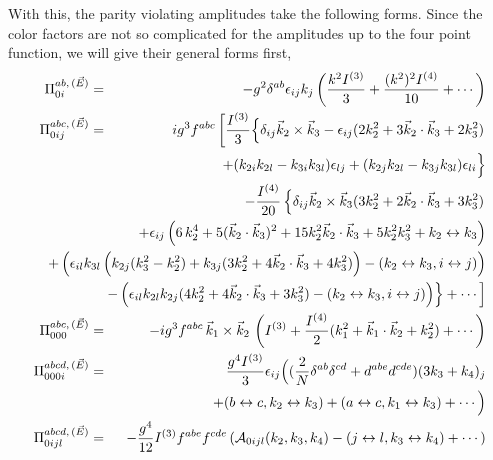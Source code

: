 \documentclass[a4paper,12pt]{article}
\begin{document}
With this, the parity violating amplitudes take the following
forms. Since the color factors are not so complicated for the
amplitudes up to the four point function, we will give their general
forms first,
\begin{eqnarray}
\Pi_{0i}^{ab,\,(\vec{E})} & = &  -
g^{2}\delta^{ab}\epsilon_{ij}k_{j}\left({k^{2}I^{(3)}\over 3} +
  {(k^{2})^{2}I^{(4)}\over 10} + \cdots \right)\nonumber\\
\Pi_{0ij}^{abc,\,(\vec{E})} & = & ig^{3}f^{abc}\left[{I^{(3)}\over
    3}\Big\{\delta_{ij}\vec{k}_{2}\times\vec{k}_{3} - \epsilon_{ij}(2
    k_{2}^{2}+3\vec{k}_{2}\cdot\vec{k}_{3} + 2
    k_{3}^{2})\right.\nonumber\\
 &  & \quad +  (k_{2i}k_{2l} - k_{3i}k_{3l}) \epsilon_{lj} +
   (k_{2j}k_{2l} - k_{3j}k_{3l}) \epsilon_{li}\Big\}\nonumber\\
 &  & \quad -{I^{(4)}\over 20}\left\{\delta_{ij}
   \vec{k}_{2}\times\vec{k}_{3} (3k_{2}^{2} + 2
   \vec{k}_{2}\cdot\vec{k}_{3} + 3 k_{3}^{2})\right.\nonumber\\
 & & \!\!\!\!\!\!\!\!\!\!\!\!\!\!\!\!\!\!\!\!\!\!\!\!\!\!\!\!\!\!  +
 \epsilon_{ij} \left(6\,k_{2}^{4} + 5
   (\vec{k}_{2}\cdot \vec{k}_{3})^{2} + 15 k_{2}^{2}
   \vec{k}_{2}\cdot\vec{k}_{3} + 5 k_{2}^{2}k_{3}^{2} +
   k_{2}\leftrightarrow k_{3}\right)\nonumber\\
 &  & \!\!\!\!\!\!\!\!\!\!\!\!\!\!\!\!\!\!\!\!\!\!\!\!\!\!\!\!\!\! +
 \left(\epsilon_{il}k_{3l}\left(k_{2j}(k_{3}^{2}-k_{2}^{2}) +
     k_{3j}(3 k_{2}^{2} + 4 \vec{k}_{2}\cdot\vec{k}_{3} +
     4k_{3}^{2})\right)-(k_{2}\leftrightarrow k_{3}, i\leftrightarrow
   j)\right)\nonumber\\
 &  &  \!\!\!\!\!\!\!\!\!\!\!\!\!\!\!\!\!\!\!\!\!\!\!\!\!\!\!\!\!\!
\left.\left. - \left(\epsilon_{il}k_{2l}k_{2j} (4k_{2}^{2}
       + 4 \vec{k}_{2}\cdot \vec{k}_{3} + 3 k_{3}^{2}) -
       (k_{2}\leftrightarrow k_{3}, i\leftrightarrow
       j)\right)\right\} + \cdots \right]\nonumber\\
\Pi_{000}^{abc,\,(\vec{E})} & = & - ig^{3}
f^{abc}\,\vec{k}_{1}\times\vec{k}_{2}\,\left(I^{(3)} + {I^{(4)}\over
    2}  (k_{1}^{2} +  \vec{k}_{1}\cdot\vec{k}_{2} + k_{2}^{2}) +
  \cdots\right)\nonumber\\
\Pi_{000i}^{abcd,\,(\vec{E})} & = & {g^{4}I^{(3)}\over 3}
\epsilon_{ij}\Big(  ({2\over N}\delta^{ab}\delta^{cd} + d^{abe}d^{cde}) 
                     (3k_{3}+k_{4})_{j}\nonumber\\
& & \quad\quad\quad\;\; +(b\leftrightarrow c, k_{2}\leftrightarrow
k_{3}) + (a\leftrightarrow c, k_{1}\leftrightarrow k_{3}) +
\cdots\Big) \label{22}\\
\Pi_{0ijl}^{abcd,\,(\vec{E})} & = &
-{g^{4}\over 12} I^{(3)} f^{abe}f^{cde}\left(
  {\cal A}_{0ijl}(k_{2},k_{3},k_{4}) -(j\leftrightarrow l,
  k_{3}\leftrightarrow k_{4}) + \cdots
\right)\nonumber
\end{eqnarray}
\end{document}
